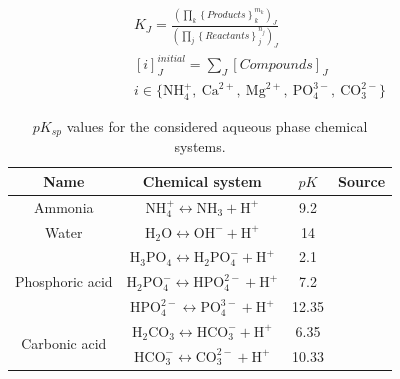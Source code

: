 \documentclass[10pt,a4paper]{article}
\begin{document}
\begin{align} \label{eq:K_sp}
& K_{J} = \frac{ \left( \prod_{k} \left\{ Products \right\}_{k}^{m_{k}} \right)_{J}} { \left( \prod_{j} \left\{ Reactants \right\}_{j}^{n_{j}} \right)_{J}}&
\\
& \left[ i \right]_{J}^{initial} =  \sum_{J} \left[Compounds\right]_{J}  \label{eq:balance1}&
\\
& i \in \bigl\{{\text{NH}_{4}^{+}, \ \text{Ca}^{2+}, \ \text{Mg}^{2+}, \ \text{PO}_{4}^{3-}, \ \text{CO}_{3}^{2-}} \bigr\}  \nonumber&
\end{align}

\begin{table}[H] 
	\begin{adjustwidth}{}{}
		\centering
		\caption{$pK_{{sp}}$ values for the considered aqueous phase chemical systems.} \label{table:pK}
		\begin{tabular}{c c c c}
			\toprule
			Name	& Chemical system &${pK}$	&Source	\\ \midrule
			Ammonia & $\text{NH}_{4}^{+} \leftrightarrow \text{NH}_{3} + \text{H}^{+}$	&9.2 &\shortcite{Bates}	\\ 
			Water & $\text{H}_{2}\text{O} \leftrightarrow \text{OH}^{-} + \text{H}^{+}$	&14  &\shortcite{Skoog}	\\ 
			\multirow{3}{*}{Phosphoric acid} & $\text{H}_{3}\text{PO}_{4} \leftrightarrow \text{H}_{2}\text{PO}_{4}^{-} + \text{H}^{+}$	&2.1	&\shortcite{Ohlinger}	\\ 
			&$\text{H}_{2}\text{PO}_{4}^{-} \leftrightarrow \text{HPO}_{4}^{2-} + \text{H}^{+}$	&7.2  &\shortcite{Ohlinger}	\\ 
			&$\text{HPO}_{4}^{2-} \leftrightarrow \text{PO}_{4}^{3-} + \text{H}^{+}$	&12.35 &\shortcite{Ohlinger}	\\ 
			\multirow{2}{*}{Carbonic acid} & $\text{H}_{2}\text{CO}_{3} \leftrightarrow \text{HCO}_{3}^{-} + \text{H}^{+}$	&6.35	&\shortcite{Skoog}	\\  
			&$\text{HCO}_{3}^{-} \leftrightarrow \text{CO}_{3}^{2-} + \text{H}^{+}$	&10.33	&\shortcite{Skoog}	\\ \bottomrule
		\end{tabular}
	\end{adjustwidth}
\end{table}
\end{document}
